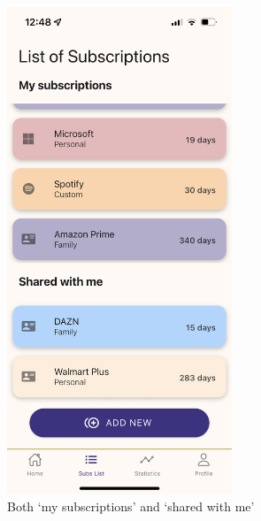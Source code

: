 \documentclass[12pt]{article}
\begin{document}
\begin{figure}[h!]
    \centering
    \begin{minipage}[c]{0.45\textwidth}
        \centering
        \includegraphics[width=0.6\textwidth, clip]{../../assets/smartphone/subsList2.PNG}
        \caption{Both `my subscriptions' and `shared with me'}
        \label{fig:subsList2}
    \end{minipage}\hspace{1cm}%
    \begin{minipage}[c]{0.45\textwidth}
        \centering

\end{minipage}
\end{figure}
\end{document}
